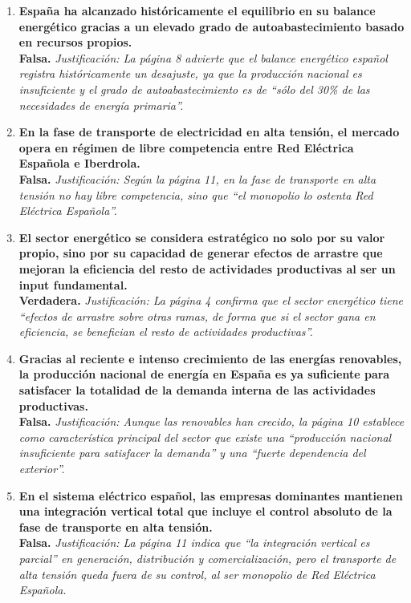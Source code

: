 \begin{enumerate}[label=\textbf{\arabic*.}]
    \item \textbf{España ha alcanzado históricamente el equilibrio en su balance energético gracias a un elevado grado de autoabastecimiento basado en recursos propios.} \\
    \textbf{Falsa.} \textit{Justificación: La página 8 advierte que el balance energético español registra históricamente un desajuste, ya que la producción nacional es insuficiente y el grado de autoabastecimiento es de ``sólo del 30\% de las necesidades de energía primaria''.}

    \item \textbf{En la fase de transporte de electricidad en alta tensión, el mercado opera en régimen de libre competencia entre Red Eléctrica Española e Iberdrola.} \\
    \textbf{Falsa.} \textit{Justificación: Según la página 11, en la fase de transporte en alta tensión no hay libre competencia, sino que ``el monopolio lo ostenta Red Eléctrica Española''.}

    \item \textbf{El sector energético se considera estratégico no solo por su valor propio, sino por su capacidad de generar efectos de arrastre que mejoran la eficiencia del resto de actividades productivas al ser un input fundamental.} \\
    \textbf{Verdadera.} \textit{Justificación: La página 4 confirma que el sector energético tiene ``efectos de arrastre sobre otras ramas, de forma que si el sector gana en eficiencia, se benefician el resto de actividades productivas''.}

    \item \textbf{Gracias al reciente e intenso crecimiento de las energías renovables, la producción nacional de energía en España es ya suficiente para satisfacer la totalidad de la demanda interna de las actividades productivas.} \\
    \textbf{Falsa.} \textit{Justificación: Aunque las renovables han crecido, la página 10 establece como característica principal del sector que existe una ``producción nacional insuficiente para satisfacer la demanda'' y una ``fuerte dependencia del exterior''.}

    \item \textbf{En el sistema eléctrico español, las empresas dominantes mantienen una integración vertical total que incluye el control absoluto de la fase de transporte en alta tensión.} \\
    \textbf{Falsa.} \textit{Justificación: La página 11 indica que ``la integración vertical es parcial'' en generación, distribución y comercialización, pero el transporte de alta tensión queda fuera de su control, al ser monopolio de Red Eléctrica Española.}


\end{enumerate}
